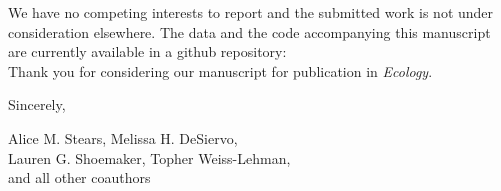 \documentclass{article}
\begin{document}
We have no competing interests to report and the submitted work is not under consideration
elsewhere. The data and the code accompanying this manuscript are currently available in a github repository:\\
 Thank you for considering our manuscript for publication in \textit{Ecology}.

\bigskip %

Sincerely,

Alice M. Stears,  Melissa H. DeSiervo, \\
Lauren G. Shoemaker, Topher Weiss-Lehman,\\
and all other coauthors


\vspace{25pt} %
\end{document}
